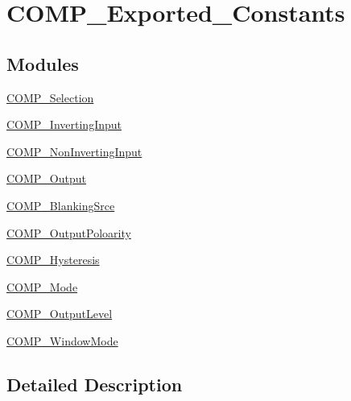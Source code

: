\hypertarget{group___c_o_m_p___exported___constants}{\section{C\-O\-M\-P\-\_\-\-Exported\-\_\-\-Constants}
\label{group___c_o_m_p___exported___constants}
}
\subsection*{Modules}
\begin{DoxyCompactItemize}
\item 
\hyperlink{group___c_o_m_p___selection}{C\-O\-M\-P\-\_\-\-Selection}
\item 
\hyperlink{group___c_o_m_p___inverting_input}{C\-O\-M\-P\-\_\-\-Inverting\-Input}
\item 
\hyperlink{group___c_o_m_p___non_inverting_input}{C\-O\-M\-P\-\_\-\-Non\-Inverting\-Input}
\item 
\hyperlink{group___c_o_m_p___output}{C\-O\-M\-P\-\_\-\-Output}
\item 
\hyperlink{group___c_o_m_p___blanking_srce}{C\-O\-M\-P\-\_\-\-Blanking\-Srce}
\item 
\hyperlink{group___c_o_m_p___output_poloarity}{C\-O\-M\-P\-\_\-\-Output\-Poloarity}
\item 
\hyperlink{group___c_o_m_p___hysteresis}{C\-O\-M\-P\-\_\-\-Hysteresis}
\item 
\hyperlink{group___c_o_m_p___mode}{C\-O\-M\-P\-\_\-\-Mode}
\item 
\hyperlink{group___c_o_m_p___output_level}{C\-O\-M\-P\-\_\-\-Output\-Level}
\item 
\hyperlink{group___c_o_m_p___window_mode}{C\-O\-M\-P\-\_\-\-Window\-Mode}
\end{DoxyCompactItemize}


\subsection{Detailed Description}
